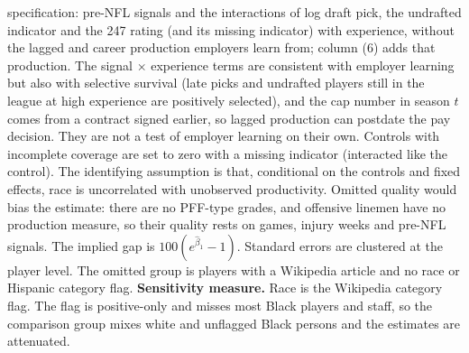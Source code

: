 \begin{table}[!h]
{\begin{threeparttable}
\begin{tablenotes}[para]
\citet{altonji2001employer} specification: pre-NFL signals and the interactions of log draft pick, the undrafted indicator and the 247 rating (and its missing indicator) with experience, without the lagged and career production employers learn from; column (6) adds that production. The signal $\times$ experience terms are consistent with employer learning but also with selective survival (late picks and undrafted players still in the league at high experience are positively selected), and the cap number in season $t$ comes from a contract signed earlier, so lagged production can postdate the pay decision. They are not a test of employer learning on their own. Controls with incomplete coverage are set to zero with a missing indicator (interacted like the control). The identifying assumption is that, conditional on the controls and fixed effects, race is uncorrelated with unobserved productivity. Omitted quality would bias the estimate: there are no PFF-type grades, and offensive linemen have no production measure, so their quality rests on games, injury weeks and pre-NFL signals. The implied gap is $100(e^{\hat\beta_1}-1)$. Standard errors are clustered at the player level. The omitted group is players with a Wikipedia article and no race or Hispanic category flag. \textbf{Sensitivity measure.} Race is the Wikipedia category flag. The flag is positive-only and misses most Black players and staff, so the comparison group mixes white and unflagged Black persons and the estimates are attenuated.
\end{tablenotes}
\end{threeparttable}}
\end{table}
